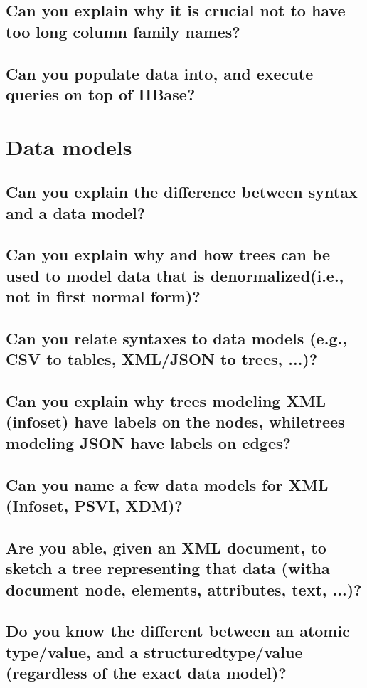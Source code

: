 \documentclass{article}
\begin{document}
\subsection{Can you explain why it is crucial not to have too long column family names?}
\subsection{Can you populate data into, and execute queries on top of HBase?}

\pagebreak

\section{Data models}
\subsection{Can you explain the difference between syntax and a data model?}
\subsection{Can you explain why and how trees can be used to model data that is denormalized(i.e., not in first normal form)?}
\subsection{Can you relate syntaxes to data models (e.g., CSV to tables, XML/JSON to trees, ...)?}
\subsection{Can you explain why trees modeling XML (infoset) have labels on the nodes, whiletrees modeling JSON have labels on edges?}
\subsection{Can you name a few data models for XML (Infoset, PSVI, XDM)?}
\subsection{Are you able, given an XML document, to sketch a tree representing that data (witha document node, elements, attributes, text, ...)?}
\subsection{Do you know the different between an atomic type/value, and a structuredtype/value (regardless of the exact data model)?}
\end{document}
